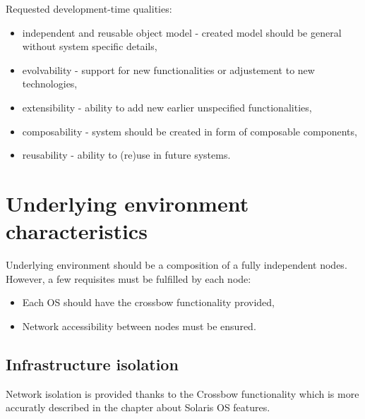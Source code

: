 \documentclass[11pt]{book}
\begin{document}
		\medskip
		
		Requested development-time qualities:
		\begin{itemize}
			\item{independent and reusable object model - created model should be general without system specific details, }
			\item{evolvability - support for new functionalities or adjustement to new technologies,}
			\item{extensibility - ability to add new earlier unspecified functionalities, }
			\item{composability - system should be created in form of composable components, }
			\item{reusability - ability to (re)use in future systems.}
		\end{itemize}
		

    \section{Underlying environment characteristics}
	
		Underlying environment should be a composition of a fully independent nodes. However, a few requisites
		must be fulfilled by each node:
		
		\begin{itemize}
			\item{Each OS should have the crossbow functionality provided, }
			\item{Network accessibility between nodes must be ensured. }
		\end{itemize}
		

	

      \subsection{Infrastructure isolation}
	  
		Network isolation is provided thanks to the Crossbow functionality which is more accuratly described in the chapter
		about Solaris OS features. 
		
\end{document}
